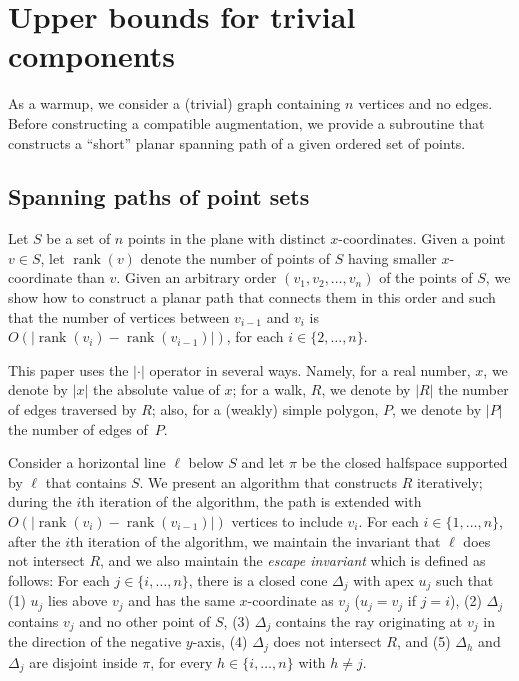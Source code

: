 \documentclass{patmorin}
\DeclareMathOperator{\rank}{rank}
\begin{document}
\section{Upper bounds for trivial components}\label{section:Trivial components}
As a warmup, we consider a (trivial) graph containing $n$ vertices and no edges.
Before constructing a compatible augmentation, we provide a subroutine
that constructs a ``short'' planar spanning path of a given ordered set  of points.

\subsection{Spanning paths of point sets}
Let $S$ be a set of $n$ points in the plane with distinct $x$-coordinates.
Given a point $v\in S$, let $\rank(v)$ denote the number of points of $S$ having smaller $x$-coordinate than $v$.
Given an arbitrary order $(v_1, v_2, \ldots, v_n)$ of the points of $S$, we show how to construct a planar path that connects them in this order and such that the number of vertices between $v_{i-1}$ and $v_{i}$ is $O(|\rank(v_i) - \rank(v_{i-1})|)$, for each $i\in \{2, \dots, n\}$.

This paper uses the $|\cdot|$ operator in several ways.  Namely, for a real number, $x$, we denote by $|x|$ the absolute value of $x$; for a walk, $R$, we denote by $|R|$ the number of edges traversed by $R$; also, for a (weakly) simple polygon, $P$, we denote by $|P|$ the number of edges of~$P$.

Consider a horizontal line $\ell$ below $S$ and let $\pi$ be the closed halfspace supported by $\ell$ that contains $S$.  We present an algorithm that constructs $R$ iteratively; during the $i$th iteration of the algorithm, the path is extended with $O(|\rank(v_i) - \rank(v_{i-1})|)$ vertices to include $v_i$.  For each $i\in \{1,\dots,n\}$, after the $i$th iteration of the algorithm, we maintain the invariant that $\ell$ does not intersect $R$, and we also maintain the \emph{escape invariant} which is defined as follows:
For each $j\in \{i, \dots, n\}$, there is a closed cone $\Delta_{j}$ with apex $u_{j}$ such that (1) $u_j$ lies above $v_j$ and has the same $x$-coordinate as $v_j$ ($u_j =v_j$ if $j = i$), (2) $\Delta_j$ contains $v_j$ and no other point of $S$, (3) $\Delta_j$ contains the ray originating at $v_j$ in the direction of the negative $y$-axis, (4) $\Delta_j$ does not intersect $R$, and (5) $\Delta_h$ and $\Delta_j$ are disjoint inside $\pi$, for every $h\in \{i,\dots,n\}$ with $h\neq j$.
\end{document}
